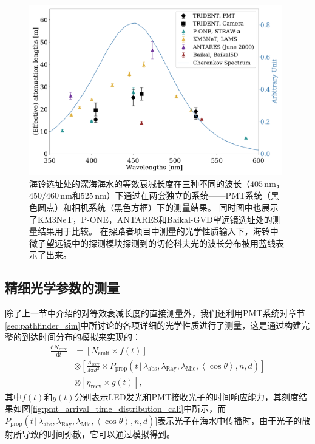 \begin{figure}[htbp]%
    \centering
    \includegraphics[width=0.98\textwidth]{img/pathfinder_op_result.pdf}
    \caption{海铃选址处的深海海水的等效衰减长度在三种不同的波长（$405\,\mathrm{nm}$，$450/460\,\mathrm{nm}$和$525\,\mathrm{nm}$）下通过在两套独立的系统——PMT系统（黑色圆点）和相机系统（黑色方框）下的测量结果。
    同时图中也展示了KM3NeT\cite{OP_KM3NeT_LAMS:2011}，P-ONE\cite{OP_P-One:2021}，ANTARES\cite{OP_ANTARES:2004}和Baikal-GVD\cite{OP_Baikal:2012}望远镜选址处的测量结果用于比较。
    在探路者项目中测量的光学性质输入下，海铃中微子望远镜中的探测模块探测到的切伦科夫光的波长分布被用蓝线表示了出来。}
    \label{fig:pathfinder_op_result}
\end{figure}

\subsection{精细光学参数的测量}

除了上一节中介绍的对等效衰减长度的直接测量外，我们还利用PMT系统对章节\ref{sec:pathfinder_sim}中所讨论的各项详细的光学性质进行了测量，这是通过构建完整的到达时间分布的模拟来实现的：
\begin{equation}
\begin{aligned}
    \frac{\mathrm{d}N_\mathrm{recv}}{\mathrm{d}t} & =
    [ N_{\mathrm{emit}} \times f(t) ] \\
    & \otimes [ \frac{A_\mathrm{recv}}{4 \pi d^2} \times P_\mathrm{prop}( t \,\vert\, \lambda_\mathrm{abs} , \lambda_\mathrm{Ray} , \lambda_\mathrm{Mie} , \left \langle \cos\theta \right \rangle , n , d ) ] \\
    & \otimes [ \eta_\mathrm{recv} \times g(t) ] ,
    \label{eq:arrival_time_distribution}
\end{aligned}
\end{equation}
其中$f(t)$和$g(t)$分别表示LED发光和PMT接收光子的时间响应能力，其刻度结果如图\ref{fig:pmt_arrival_time_distribution_cali}中所示，而$P_\mathrm{prop}( t \,\vert\, \lambda_\mathrm{abs} , \lambda_\mathrm{Ray} , \lambda_\mathrm{Mie} , \left \langle \cos\theta \right \rangle , n , d ) ]$表示光子在海水中传播时，由于光子的散射所导致的时间弥散，它可以通过模拟得到。

